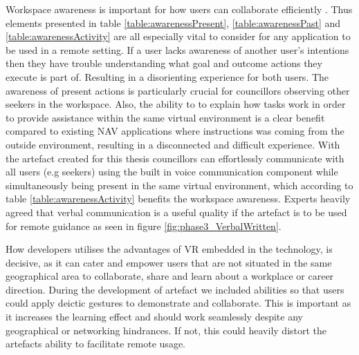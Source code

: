 Workspace awareness is important for how users can collaborate efficiently \cite{gutwin1996workspace}. Thus elements presented in table \ref{table:awarenessPresent}, \ref{table:awarenessPast}  and \ref{table:awarenessActivity} are all especially vital to consider for any application to be used in a remote setting. If a user lacks awareness of another user's intentions then they have trouble understanding what goal and outcome actions they execute is part of. Resulting in a disorienting experience for both users. The awareness of present actions is particularly crucial for councillors observing other seekers in the workspace. Also, the ability to to explain how tasks work in order to provide assistance within the same virtual environment is a clear benefit compared to existing NAV applications where instructions was coming from the outside environment, resulting in a disconnected and difficult experience. With the artefact created for this thesis councillors can effortlessly communicate with all users (e.g seekers) using the built in voice communication component while simultaneously being present in the same virtual environment, which according to table \ref{table:awarenessActivity} benefits the workspace awareness. Experts heavily agreed that verbal communication is a useful quality if the artefact is to be used for remote guidance as seen in figure \ref{fig:phase3_VerbalWritten}.         




How developers utilises the advantages of VR embedded in the technology, is decisive, as it can cater and empower users that are not situated in the same geographical area to collaborate, share and learn about a workplace or career direction. During the development of artefact we included abilities so that users could apply deictic gestures to demonstrate and collaborate. This is important as it increases the learning effect \cite{stahl2006computer} and should work seamlessly despite any geographical or networking hindrances. If not, this could heavily distort the artefacts ability to facilitate remote usage.               


